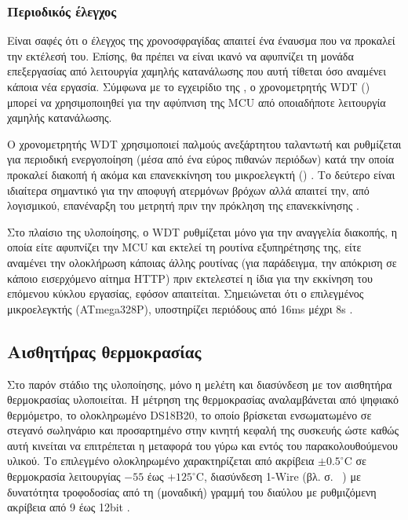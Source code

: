 \subsubsection{Περιοδικός έλεγχος}

Είναι σαφές ότι ο έλεγχος της χρονοσφραγίδας απαιτεί ένα έναυσμα που να προκαλεί
την εκτέλεσή του. Επίσης, θα πρέπει να είναι ικανό να αφυπνίζει τη μονάδα
επεξεργασίας από λειτουργία χαμηλής κατανάλωσης που αυτή τίθεται όσο αναμένει
κάποια νέα εργασία. Σύμφωνα με το εγχειρίδιο της \textcite[38]{atmel13}, ο
χρονομετρητής WDT () μπορεί να χρησιμοποιηθεί για την
αφύπνιση της MCU από οποιαδήποτε λειτουργία χαμηλής κατανάλωσης.

Ο χρονομετρητής WDT χρησιμοποιεί παλμούς ανεξάρτητου ταλαντωτή και ρυθμίζεται
για περιοδική ενεργοποίηση (μέσα από ένα εύρος πιθανών περιόδων) κατά την οποία
προκαλεί διακοπή ή ακόμα και επανεκκίνηση του μικροελεγκτή ()
\parencite[50]{atmel13}. Το δεύτερο είναι ιδιαίτερα σημαντικό για την αποφυγή
ατερμόνων βρόχων αλλά απαιτεί την, από λογισμικού, επανέναρξη του μετρητή πριν
την πρόκληση της επανεκκίνησης \parencite[50]{atmel13}.

Στο πλαίσιο της υλοποίησης, ο WDT ρυθμίζεται μόνο για την αναγγελία διακοπής, η
οποία είτε αφυπνίζει την MCU και εκτελεί τη ρουτίνα εξυπηρέτησης της, είτε
αναμένει την ολοκλήρωση κάποιας άλλης ρουτίνας (για παράδειγμα, την απόκριση σε
κάποιο εισερχόμενο αίτημα HTTP) πριν εκτελεστεί η ίδια για την εκκίνηση του
επόμενου κύκλου εργασίας, εφόσον απαιτείται. Σημειώνεται ότι ο επιλεγμένος
μικροελεγκτής (ATmega328P), υποστηρίζει περιόδους από 16ms μέχρι 8s
\parencite[55]{atmel13}.


\subsection{Αισθητήρας θερμοκρασίας}
\label{subsec:ds18b20}

Στο παρόν στάδιο της υλοποίησης, μόνο η μελέτη και διασύνδεση με τον αισθητήρα
θερμοκρασίας υλοποιείται.
Η μέτρηση της θερμοκρασίας αναλαμβάνεται από ψηφιακό θερμόμετρο, το ολοκληρωμένο
DS18B20, το οποίο βρίσκεται ενσωματωμένο σε στεγανό σωληνάριο και προσαρτημένο
στην κινητή κεφαλή της συσκευής ώστε καθώς αυτή κινείται να επιτρέπεται η
μεταφορά του γύρω και εντός του παρακολουθούμενου υλικού. Το επιλεγμένο
ολοκληρωμένο χαρακτηρίζεται από ακρίβεια $\pm0.5^\circ$C σε θερμοκρασία
λειτουργίας $-55$ έως $+125^\circ$C, διασύνδεση 1-Wire (βλ. σ.~%
\pageref{subsec:1-wire}) με δυνατότητα τροφοδοσίας από τη (μοναδική) γραμμή του
διαύλου με ρυθμιζόμενη ακρίβεια από 9 έως 12bit \parencite[1]{ds18b20}.

